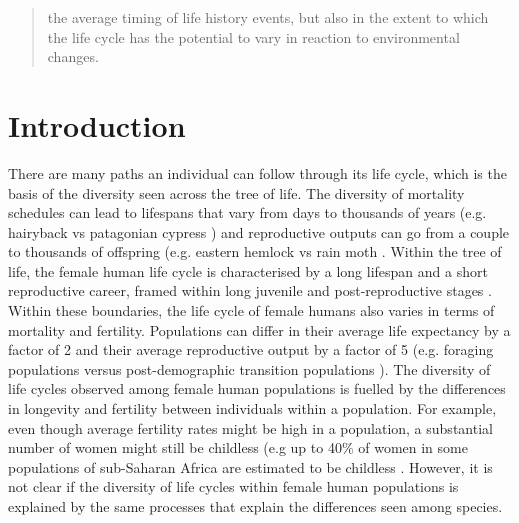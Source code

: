 \documentclass{article}
\begin{document}
\begin{abstract}
the average timing of life history events, but also in the extent to which the life cycle has the potential to vary in reaction to environmental changes.
\end{abstract}

\section{Introduction}

There are many paths an individual can follow through its life cycle, which is the basis of the diversity seen across the tree of life. The diversity of mortality schedules can lead to lifespans that vary from days to thousands of years (e.g. hairyback vs patagonian cypress \citep{balsamo1988life,lara19933620}) and reproductive outputs can go from a couple to thousands of offspring (e.g. eastern hemlock vs rain moth \citep{tindale1932revision,van2017lifetime}. Within the tree of life, the female human life cycle is characterised by a long lifespan and a short reproductive career, framed within long juvenile and post-reproductive stages \citep{kaplan2000theory}. Within these boundaries, the life cycle of female humans also varies in terms of mortality and fertility. Populations can differ in their average life expectancy by a factor of 2 and their average reproductive output by a factor of 5 (e.g. foraging populations \citep{migliano2007life} versus post-demographic transition populations \citep{de2017maximum}). The diversity of life cycles observed among female human populations is fuelled by the differences in longevity and fertility between individuals within a population. For example, even though average fertility rates might be high in a population, a substantial number of women might still be childless (e.g up to 40\% of women in some populations of sub-Saharan Africa are estimated to be childless \citep{bailey1995sexuality,belsey1976epidemiology}. However, it is not clear if the diversity of life cycles within female human populations is explained by the same processes that explain the differences seen among species. 
\end{document}

